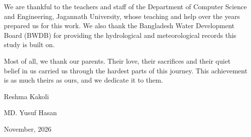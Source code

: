 We are thankful to the teachers and staff of the Department of Computer
Science and Engineering, Jagannath University, whose teaching and help over
the years prepared us for this work. We also thank the Bangladesh Water
Development Board (BWDB) for providing the hydrological and meteorological
records this study is built on.

Most of all, we thank our parents. Their love, their sacrifices and their
quiet belief in us carried us through the hardest parts of this journey.
This achievement is as much theirs as ours, and we dedicate it to them.



\vspace{1cm}

\hfill Reshma Kakoli

\hfill MD. Yusuf Hasan

\hfill November, 2026
%